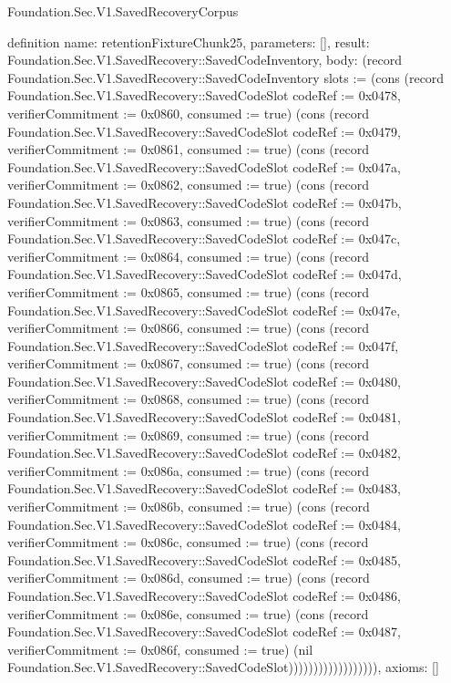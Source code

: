 \begin{lexlean}{Foundation.Sec.V1.SavedRecoveryCorpus}
\begin{semanticmodule}
definition{
  name: retentionFixtureChunk25,
  parameters: [],
  result: Foundation.Sec.V1.SavedRecovery::SavedCodeInventory,
  body: (record Foundation.Sec.V1.SavedRecovery::SavedCodeInventory {slots := (cons (record Foundation.Sec.V1.SavedRecovery::SavedCodeSlot {codeRef := 0x0478, verifierCommitment := 0x0860, consumed := true}) (cons (record Foundation.Sec.V1.SavedRecovery::SavedCodeSlot {codeRef := 0x0479, verifierCommitment := 0x0861, consumed := true}) (cons (record Foundation.Sec.V1.SavedRecovery::SavedCodeSlot {codeRef := 0x047a, verifierCommitment := 0x0862, consumed := true}) (cons (record Foundation.Sec.V1.SavedRecovery::SavedCodeSlot {codeRef := 0x047b, verifierCommitment := 0x0863, consumed := true}) (cons (record Foundation.Sec.V1.SavedRecovery::SavedCodeSlot {codeRef := 0x047c, verifierCommitment := 0x0864, consumed := true}) (cons (record Foundation.Sec.V1.SavedRecovery::SavedCodeSlot {codeRef := 0x047d, verifierCommitment := 0x0865, consumed := true}) (cons (record Foundation.Sec.V1.SavedRecovery::SavedCodeSlot {codeRef := 0x047e, verifierCommitment := 0x0866, consumed := true}) (cons (record Foundation.Sec.V1.SavedRecovery::SavedCodeSlot {codeRef := 0x047f, verifierCommitment := 0x0867, consumed := true}) (cons (record Foundation.Sec.V1.SavedRecovery::SavedCodeSlot {codeRef := 0x0480, verifierCommitment := 0x0868, consumed := true}) (cons (record Foundation.Sec.V1.SavedRecovery::SavedCodeSlot {codeRef := 0x0481, verifierCommitment := 0x0869, consumed := true}) (cons (record Foundation.Sec.V1.SavedRecovery::SavedCodeSlot {codeRef := 0x0482, verifierCommitment := 0x086a, consumed := true}) (cons (record Foundation.Sec.V1.SavedRecovery::SavedCodeSlot {codeRef := 0x0483, verifierCommitment := 0x086b, consumed := true}) (cons (record Foundation.Sec.V1.SavedRecovery::SavedCodeSlot {codeRef := 0x0484, verifierCommitment := 0x086c, consumed := true}) (cons (record Foundation.Sec.V1.SavedRecovery::SavedCodeSlot {codeRef := 0x0485, verifierCommitment := 0x086d, consumed := true}) (cons (record Foundation.Sec.V1.SavedRecovery::SavedCodeSlot {codeRef := 0x0486, verifierCommitment := 0x086e, consumed := true}) (cons (record Foundation.Sec.V1.SavedRecovery::SavedCodeSlot {codeRef := 0x0487, verifierCommitment := 0x086f, consumed := true}) (nil Foundation.Sec.V1.SavedRecovery::SavedCodeSlot)))))))))))))))))}),
  axioms: []
}


\end{semanticmodule}
\end{lexlean}
